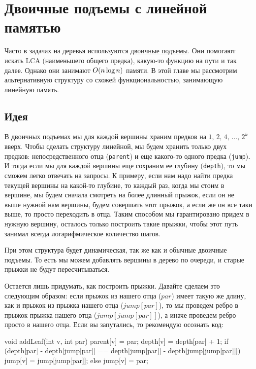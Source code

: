 \chapter{Двоичные подъемы с линейной памятью}\label{linear-binups}

Часто в задачах на деревья используются \href{https://e-maxx.ru/algo/lca_simpler}{двоичные подъемы}. Они помогают искать LCA (наименьшего общего предка), какую-то функцию на пути и так далее. Однако они занимают $O(n \log n)$ памяти. В этой главе мы рассмотрим альтернативную структуру со схожей функциональностью, занимающую линейную память.

\section{Идея}

В двоичных подъемах мы для каждой вершины храним предков на $1$, $2$, $4$, $\ldots$, $2^k$ вверх. Чтобы сделать структуру линейной, мы будем хранить только двух предков: непосредственного отца (\verb+parent+) и еще какого-то одного предка (\verb+jump+). И тогда если мы для каждой вершины еще сохраним ее глубину (\verb+depth+), то мы сможем легко отвечать на запросы. К примеру, если нам надо найти предка текущей вершины на какой-то глубине, то каждый раз, когда мы стоим в вершине, мы будем сначала смотреть на более длинный прыжок, если он не выше нужной нам вершины, будем совершать этот прыжок, а если же он все таки выше, то просто переходить в отца. Таким способом мы гарантировано придем в нужную вершину, осталось только построить такие прыжки, чтобы этот путь занимал всегда логарифмическое количество шагов.

При этом структура будет динамическая, так же как и обычные двоичные подъемы. То есть мы можем добавлять вершины в дерево по очереди, и старые прыжки не будут пересчитываться.

Остается лишь придумать, как построить прыжки. Давайте сделаем это следующим образом: если прыжок из нашего отца ($par$) имеет такую же длину, как и прыжок из прыжка нашего отца ($jump[par]$), то мы проведем ребро в прыжок прыжка нашего отца ($jump[jump[par]]$), а иначе проведем ребро просто в нашего отца. Если вы запутались, то рекомендую осознать код:

\begin{code}
void addLeaf(int v, int par) {
    parent[v] = par;
    depth[v] = depth[par] + 1;
    if (depth[par] - depth[jump[par]] == depth[jump[par]] - depth[jump[jump[par]]]) {
        jump[v] = jump[jump[par]];
    } else {
        jump[v] = par;
    }
}
\end{code}


